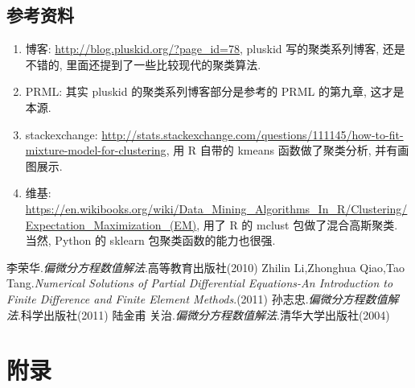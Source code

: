 \documentclass[a4paper,UTF8]{ctexart}
\theoremstyle{plain} \newtheorem{theorem}{定理}[section]
\theoremstyle{plain} \newtheorem{definition}{定义}[section]
\theoremstyle{plain} \newtheorem{lemma}{引理}[section]
\theoremstyle{plain} \newtheorem{proposition}{命题}[section]
\theoremstyle{plain} \newtheorem{example}{例}[section]
\theoremstyle{plain} \newtheorem{remark}{注}[section]
\theoremstyle{plain} \newtheorem{corollary}{推论}[section]
\begin{document}
\subsection{参考资料}
\begin{enumerate}[(1)]
\item 博客: \url{http://blog.pluskid.org/?page_id=78}, pluskid 写的聚类系列博客, 还是不错的, 里面还提到了一些比较现代的聚类算法.

\item PRML: 其实 pluskid 的聚类系列博客部分是参考的 PRML 的第九章, 这才是本源.

\item stackexchange: \url{http://stats.stackexchange.com/questions/111145/how-to-fit-mixture-model-for-clustering}, 用 R 自带的 kmeans 函数做了聚类分析, 并有画图展示.

\item 维基: \url{https://en.wikibooks.org/wiki/Data_Mining_Algorithms_In_R/Clustering/Expectation_Maximization_(EM)}, 用了 R 的 mclust 包做了混合高斯聚类. 当然, Python 的 sklearn 包聚类函数的能力也很强.

\end{enumerate}





\begin{thebibliography}{4}
   李荣华.\emph{偏微分方程数值解法}.高等教育出版社(2010) 
   Zhilin Li,Zhonghua Qiao,Tao Tang.\emph{Numerical Solutions of Partial Differential Equations-An Introduction to Finite Difference and Finite Element Methods}.(2011)
   孙志忠.\emph{偏微分方程数值解法}.科学出版社(2011)
   陆金甫 关治.\emph{偏微分方程数值解法}.清华大学出版社(2004)
  
\end{thebibliography}

\newpage

\section*{附录}
\end{document}
